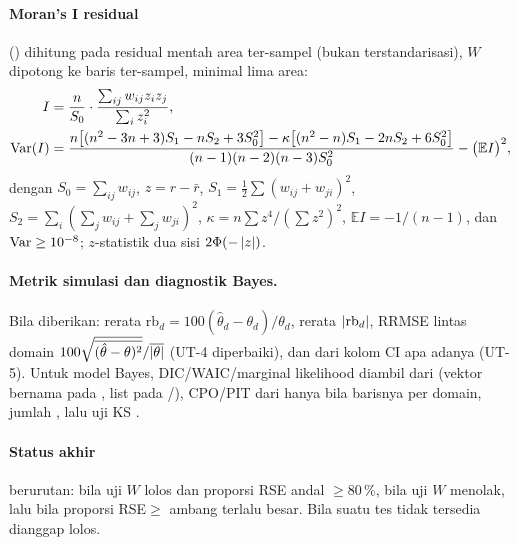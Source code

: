 \paragraph{Moran's I residual} () dihitung pada
residual mentah area ter-sampel (bukan terstandarisasi), $W$ dipotong ke
baris ter-sampel, minimal lima area:
\begin{align}
  I&=\frac{n}{S_0}\cdot\frac{\sum_{ij}w_{ij}z_iz_j}{\sum_i z_i^2},
    \label{eq:moran-I}\\
  \operatorname{Var}(I)&=\frac{
    n\bigl[(n^2-3n+3)S_1-nS_2+3S_0^2\bigr]
    -\kappa\bigl[(n^2-n)S_1-2nS_2+6S_0^2\bigr]}
    {(n-1)(n-2)(n-3)S_0^2}-\bigl(\mathbb E I\bigr)^2,
  \label{eq:moran-var}
\end{align}
dengan $S_0=\sum_{ij}w_{ij}$, $z=r-\bar r$,
$S_1=\tfrac12\sum(w_{ij}+w_{ji})^2$, $S_2=\sum_i(\sum_jw_{ij}+\sum_jw_{ji})^2$,
$\kappa=n\sum z^4/(\sum z^2)^2$, $\mathbb E I=-1/(n-1)$, dan
$\operatorname{Var}\ge10^{-8}$; $z$-statistik dua sisi $2\Phi(-\left|z\right|)$.

\paragraph{Metrik simulasi dan diagnostik Bayes.} Bila  diberikan:
rerata $\mathrm{rb}_d=100(\hat\theta_d-\theta_d)/\theta_d$, rerata
$\left|\mathrm{rb}_d\right|$, RRMSE lintas domain
$100\sqrt{\overline{(\hat\theta-\theta)^2}}/\overline{\left|\theta\right|}$ (UT-4
diperbaiki), dan  dari kolom CI apa adanya (UT-5). Untuk model
Bayes, DIC/WAIC/marginal likelihood diambil dari  (vektor
bernama pada , list pada /),
CPO/PIT dari  hanya bila barisnya per domain, jumlah
, lalu uji KS .

\paragraph{Status akhir} berurutan:  bila uji $W$ lolos dan
proporsi RSE andal $\ge80\,\%$,  bila uji $W$ menolak, lalu
 bila proporsi RSE$\ge$ ambang terlalu besar.
Bila suatu tes tidak tersedia dianggap lolos.


